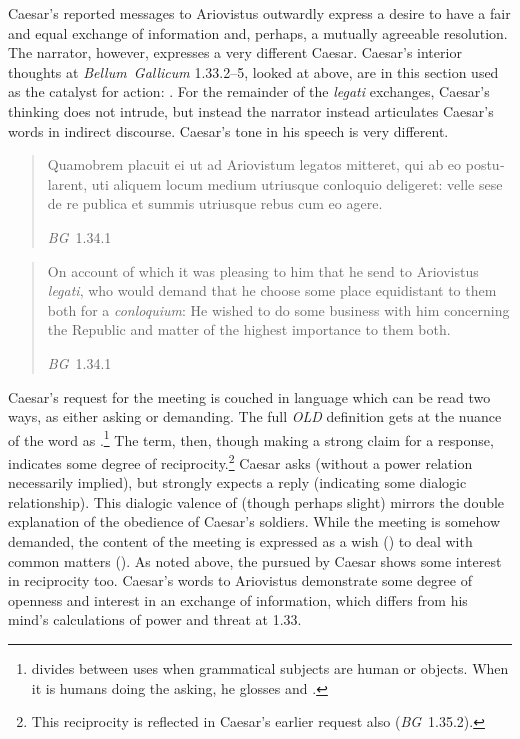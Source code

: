 \documentclass[12pt,letterpaper,oneside,final]{memoir}
\begin{document}
Caesar's reported messages to Ariovistus outwardly express a desire to have a fair and equal exchange of information and, perhaps, a mutually agreeable resolution. The narrator, however, expresses a very different Caesar. Caesar's interior thoughts at \emph{Bellum~Gallicum} 1.33.2--5, looked at above, are in this section used as the catalyst for action: . For the remainder of the \emph{legati} exchanges, Caesar's thinking does not intrude, but instead the narrator instead articulates Caesar's words in indirect discourse. Caesar's tone in his speech is very different. \blockquote[\emph{BG}~1.34.1]{\textlatin{Quamobrem placuit ei ut ad Ariovistum legatos mitteret, qui ab eo postularent, uti aliquem locum medium utriusque conloquio deligeret: velle sese de re publica et summis utriusque rebus cum eo agere.}} \blockquote[\emph{BG}~1.34.1]{On account of which it was pleasing to him that he send to Ariovistus \emph{legati}, who would demand that he choose some place equidistant to them both for a \emph{conloquium}: He wished to do some business with him concerning the Republic and matter of the highest importance to them both.} Caesar's request for the meeting is couched in language which can be read two ways, as either asking or demanding. The full \emph{OLD} definition gets at the nuance of the word as .\footnote{\textcite{meusel1887} divides  between uses when grammatical subjects are human or objects. When it is humans doing the asking, he glosses  and .} The term, then, though making a strong claim for a response, indicates some degree of reciprocity.\footnote{This reciprocity is reflected in Caesar's earlier request also (\emph{BG}~1.35.2).} Caesar asks (without a power relation necessarily implied), but strongly expects a reply (indicating some dialogic relationship). This dialogic valence of  (though perhaps slight) mirrors the double explanation of the obedience of Caesar's soldiers. While the meeting is somehow demanded, the content of the meeting is expressed as a wish () to deal with common matters (). As noted above, the  pursued by Caesar shows some interest in reciprocity too. Caesar's words to Ariovistus demonstrate some degree of openness and interest in an exchange of information, which differs from his mind's calculations of power and threat at 1.33.
\end{document}
